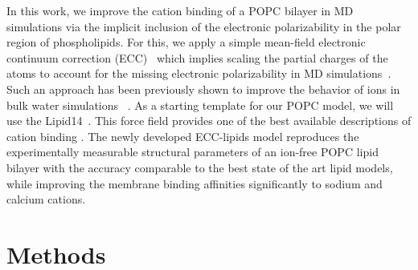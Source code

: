 \documentclass[aip,jcp,twocolumn]{revtex4}
\begin{document}


In this work, we improve the cation binding of a POPC bilayer in MD simulations via the implicit inclusion of the electronic polarizability in the polar region of phospholipids. For this, we apply a simple mean-field electronic continuum correction (ECC)~\cite{leontyev11} which implies scaling the partial charges of the atoms to account for the missing electronic polarizability in MD simulations~\cite{leontyev11}. Such an approach has been previously shown to improve the behavior of ions in bulk water simulations ~\cite{jungwirth17-new-paper-to-be-published, Pluharova2014, kohagen14, kohagen16}. As a starting template for our POPC model, we will use the Lipid14~\cite{dickson14}. This force field provides one of the best available descriptions of cation binding \cite{catte16}. The newly developed ECC-lipids model reproduces the experimentally
measurable structural parameters of an ion-free POPC lipid bilayer with the accuracy comparable to the best state of the art lipid models, while improving the membrane binding affinities significantly to sodium and calcium cations.



\section{Methods}
\end{document}
